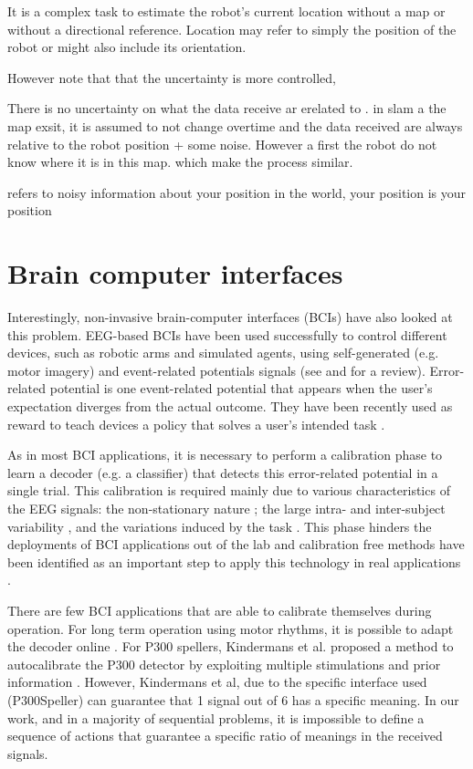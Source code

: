 It is a complex task to estimate the robot's current location without a map or without a directional reference. Location may refer to simply the position of the robot or might also include its orientation.

However note that that the uncertainty is more controlled, 

There is no uncertainty on what the data receive ar erelated to . in slam a the map exsit, it is assumed to not change overtime and the data received are always relative to the robot position + some noise. However a first the robot do not know where it is in this map. which make the process similar.


refers to noisy information about your position in the world, your position is your position




\section{Brain computer interfaces}

Interestingly, non-invasive brain-computer interfaces (BCIs) have also looked at this problem. EEG-based BCIs have been used successfully to control different devices, such as robotic arms and simulated agents, using self-generated (e.g. motor imagery) and event-related potentials signals (see \cite{chavarriaga2014errare} and \cite{millan10} for a review). 
%
Error-related potential is one event-related potential that appears when the user's expectation diverges from the actual outcome. They have been recently used as reward to teach devices a policy that solves a user's intended task \cite{chavarriaga2010learning,iturrate2010robot}.

As in most BCI applications, it is necessary to perform a calibration phase to learn a decoder (e.g. a classifier) that detects this error-related potential in a single trial. This calibration is required mainly due to various characteristics of the EEG signals: the non-stationary nature \cite{vidaurre11}; the large intra- and inter-subject variability \cite{Polich1997}, and the variations induced by the task \cite{iturrate2013task}. This phase hinders the deployments of BCI applications out of the lab and calibration free methods have been identified as an important step to apply this technology in real applications \cite{millan10}. 

There are few BCI applications that are able to calibrate themselves during operation.  For long term operation using motor rhythms, it is possible to adapt the decoder online \cite{vidaurre2010towards}. For P300 spellers, Kindermans et al. proposed a method to autocalibrate the P300 detector by exploiting multiple stimulations and prior information \cite{Kindermans2012a,Kindermans2012b}. However, Kindermans et al, due to the specific interface used (P300Speller) can guarantee that 1 signal out of 6 has a specific meaning. In our work, and in a majority of sequential problems, it is impossible to define a sequence of actions that guarantee a specific ratio of meanings in the received signals.

